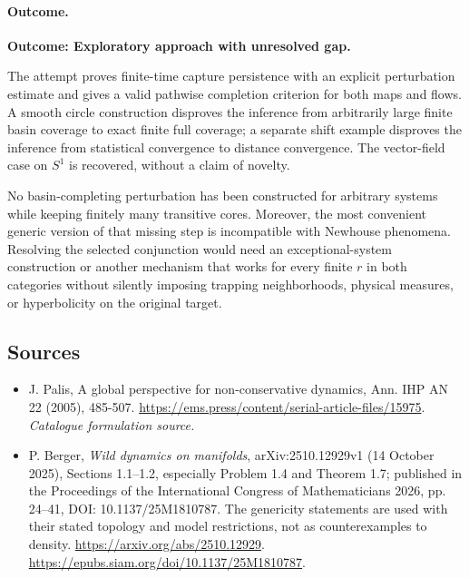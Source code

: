 \documentclass[11pt,a4paper]{article}
\begin{document}
\paragraph{Outcome.}
\textbf{Outcome: Exploratory approach with unresolved gap.}

The attempt proves finite-time capture persistence with an explicit
perturbation estimate and gives a valid pathwise completion criterion
for both maps and flows. A smooth circle construction disproves the
inference from arbitrarily large finite basin coverage to exact finite
full coverage; a separate shift example disproves the inference from
statistical convergence to distance convergence. The vector-field case
on $S^1$ is recovered, without a claim of novelty.

No basin-completing perturbation has been constructed for arbitrary
systems while keeping finitely many transitive cores. Moreover, the
most convenient generic version of that missing step is incompatible
with Newhouse phenomena. Resolving the selected conjunction would need
an exceptional-system construction or another mechanism that works
for every finite $r$ in both categories without silently imposing
trapping neighborhoods, physical measures, or hyperbolicity on the
original target.

\subsection{Sources}
\begin{itemize}\raggedright
\item[\textnormal{[S1]}]\hypertarget{source:3433:1}{} J. Palis, A global perspective for non-conservative dynamics, Ann. IHP AN 22 (2005), 485-507.
\url{https://ems.press/content/serial-article-files/15975}.
{\small\textit{Catalogue formulation source.}}
\item[\textnormal{[E1]}]\hypertarget{extra:3433:1}{}
P. Berger, \emph{Wild dynamics on manifolds}, arXiv:2510.12929v1
(14 October 2025), Sections 1.1--1.2, especially Problem 1.4 and
Theorem 1.7; published in the Proceedings of the International Congress
of Mathematicians 2026, pp. 24--41, DOI: 10.1137/25M1810787.
The genericity statements are used with their stated topology and
model restrictions, not as counterexamples to density.
\url{https://arxiv.org/abs/2510.12929}.
\url{https://epubs.siam.org/doi/10.1137/25M1810787}.
\end{itemize}
\end{document}
